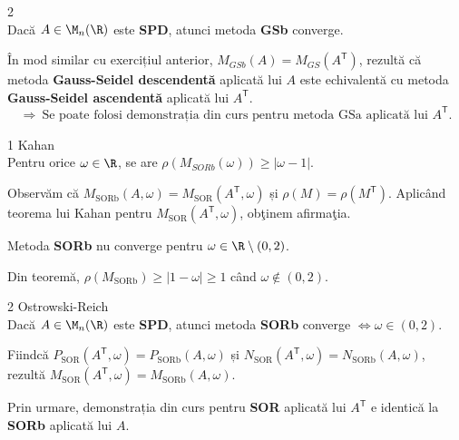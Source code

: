 \begin{teorema}{2}
    \text{ }\\[0.5em]
    Dacă $A \in \M_n(\R)$ este \textbf{SPD}, atunci metoda \textbf{GSb} converge.
\end{teorema}

\begin{demonstratie} 
    \begin{observatie} În mod similar cu exercițiul anterior, $M_{GSb}(A) = M_{GS}(A^{\mathsf T})$, rezultă că metoda \textbf{Gauss-Seidel descendentă} aplicată lui $A$ este echivalentă cu metoda \textbf{Gauss-Seidel ascendentă} aplicată lui $A^{\mathsf T}$.
    $$
    \Rightarrow\ \text{Se poate folosi demonstrația din curs pentru metoda GSa aplicată lui } A^{\mathsf T}.
    $$
    \end{observatie}
\end{demonstratie}

\begin{teorema}{1 Kahan}
    \text{ }\\[0.5em]
    Pentru orice $\omega \in \R$, se are $\rho(M_{SORb}(\omega)) \geq |\omega - 1|$.
\end{teorema}

\begin{demonstratie} 
    Observăm că $M_{\mathrm{SORb}}(A,\omega)=M_{\mathrm{SOR}}(A^{\mathsf T},\omega)$ și $\rho(M)=\rho(M^{\mathsf T})$. Aplicând teorema lui Kahan pentru $M_{\mathrm{SOR}}(A^{\mathsf T},\omega)$, obţinem afirmaţia.
\end{demonstratie}

\begin{corolar}
    Metoda \textbf{SORb} nu converge pentru $\omega \in \R \setminus (0,2)$.
\end{corolar}

\begin{demonstratie} 
    Din teoremă, $\rho(M_{\mathrm{SORb}})\ge |1-\omega|\ge 1$ când $\omega\notin(0,2)$.
\end{demonstratie}

\begin{teorema}{2 Ostrowski-Reich}
    \text{ }\\[0.5em]
    Dacă $A \in \M_n(\R)$ este \textbf{SPD}, atunci metoda \textbf{SORb} converge $\Leftrightarrow \omega \in (0,2)$.
\end{teorema}

\begin{demonstratie} 
    \begin{observatie}
        Fiindcă $P_{\mathrm{SOR}}(A^{\mathsf T},\omega)=P_{\mathrm{SORb}}(A,\omega)$ și 
        $N_{\mathrm{SOR}}(A^{\mathsf T},\omega)=N_{\mathrm{SORb}}(A,\omega)$, rezultă
        $M_{\mathrm{SOR}}(A^{\mathsf T},\omega)=M_{\mathrm{SORb}}(A,\omega)$.
    \end{observatie}
    Prin urmare, demonstrația din curs pentru \textbf{SOR} aplicată lui $A^{\mathsf T}$ e identică la \textbf{SORb} aplicată lui $A$. 
\end{demonstratie}

